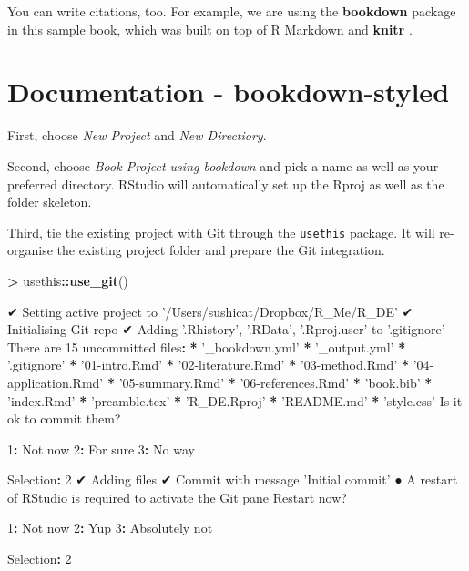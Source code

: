 \documentclass[]{book}
\newenvironment{Shaded}{\begin{snugshade}}{\end{snugshade}}
\newcommand{\DecValTok}[1]{\textcolor[rgb]{0.00,0.00,0.81}{#1}}
\newcommand{\ErrorTok}[1]{\textcolor[rgb]{0.64,0.00,0.00}{\textbf{#1}}}
\newcommand{\KeywordTok}[1]{\textcolor[rgb]{0.13,0.29,0.53}{\textbf{#1}}}
\newcommand{\NormalTok}[1]{#1}
\newcommand{\OperatorTok}[1]{\textcolor[rgb]{0.81,0.36,0.00}{\textbf{#1}}}
\newcommand{\StringTok}[1]{\textcolor[rgb]{0.31,0.60,0.02}{#1}}
\begin{document}
You can write citations, too. For example, we are using the \textbf{bookdown} package \citep{R-bookdown} in this sample book, which was built on top of R Markdown and \textbf{knitr} \citep{xie2015}.

\hypertarget{documentation---bookdown-styled}{%
\chapter{Documentation - bookdown-styled}\label{documentation---bookdown-styled}}

First, choose \emph{New Project} and \emph{New Directiory}.

Second, choose \emph{Book Project using bookdown} and pick a name as well as your preferred directory. RStudio will automatically set up the Rproj as well as the folder skeleton.

Third, tie the existing project with Git through the \texttt{usethis} package. It will re-organise the existing project folder and prepare the Git integration.

\begin{Shaded}
\begin{Highlighting}[]
\OperatorTok{>}\StringTok{ }\NormalTok{usethis}\OperatorTok{::}\KeywordTok{use_git}\NormalTok{()}

\NormalTok{✔ Setting active project to }\StringTok{'/Users/sushicat/Dropbox/R_Me/R_DE'}
\NormalTok{✔ Initialising Git repo}
\NormalTok{✔ Adding }\StringTok{'.Rhistory'}\NormalTok{, }\StringTok{'.RData'}\NormalTok{, }\StringTok{'.Rproj.user'}\NormalTok{ to }\StringTok{'.gitignore'}
\NormalTok{There are }\DecValTok{15}\NormalTok{ uncommitted files}\OperatorTok{:}
\ErrorTok{*}\StringTok{ '_bookdown.yml'}
\OperatorTok{*}\StringTok{ '_output.yml'}
\OperatorTok{*}\StringTok{ '.gitignore'}
\OperatorTok{*}\StringTok{ '01-intro.Rmd'}
\OperatorTok{*}\StringTok{ '02-literature.Rmd'}
\OperatorTok{*}\StringTok{ '03-method.Rmd'}
\OperatorTok{*}\StringTok{ '04-application.Rmd'}
\OperatorTok{*}\StringTok{ '05-summary.Rmd'}
\OperatorTok{*}\StringTok{ '06-references.Rmd'}
\OperatorTok{*}\StringTok{ 'book.bib'}
\OperatorTok{*}\StringTok{ 'index.Rmd'}
\OperatorTok{*}\StringTok{ 'preamble.tex'}
\OperatorTok{*}\StringTok{ 'R_DE.Rproj'}
\OperatorTok{*}\StringTok{ 'README.md'}
\OperatorTok{*}\StringTok{ 'style.css'}
\NormalTok{Is it ok to commit them?}

\DecValTok{1}\OperatorTok{:}\StringTok{ }\NormalTok{Not now}
\DecValTok{2}\OperatorTok{:}\StringTok{ }\NormalTok{For sure}
\DecValTok{3}\OperatorTok{:}\StringTok{ }\NormalTok{No way}

\NormalTok{Selection}\OperatorTok{:}\StringTok{ }\DecValTok{2}
\NormalTok{✔ Adding files}
\NormalTok{✔ Commit with message }\StringTok{'Initial commit'}
\NormalTok{● A restart of RStudio is required to activate the Git pane}
\NormalTok{Restart now?}

\DecValTok{1}\OperatorTok{:}\StringTok{ }\NormalTok{Not now}
\DecValTok{2}\OperatorTok{:}\StringTok{ }\NormalTok{Yup}
\DecValTok{3}\OperatorTok{:}\StringTok{ }\NormalTok{Absolutely not}

\NormalTok{Selection}\OperatorTok{:}\StringTok{ }\DecValTok{2}
\end{Highlighting}
\end{Shaded}
\end{document}
